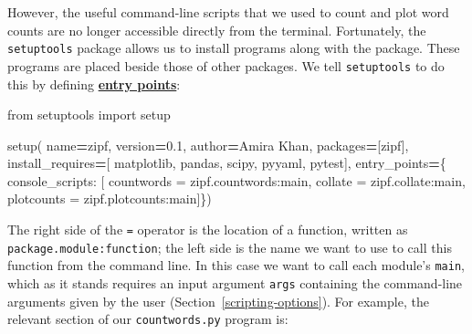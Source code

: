 \documentclass[
]{krantz}
\makeatletter
\newenvironment{Shaded}{\begin{snugshade}}{\end{snugshade}}
\newcommand{\ImportTok}[1]{#1}
\newcommand{\NormalTok}[1]{#1}
\newcommand{\OperatorTok}[1]{\textcolor[rgb]{0.81,0.36,0.00}{\textbf{#1}}}
\newcommand{\StringTok}[1]{\textcolor[rgb]{0.31,0.60,0.02}{#1}}
\newenvironment{kframe}{%
\medskip{}
\setlength{\fboxsep}{.8em}
 \def\at@end@of@kframe{}%
 \ifinner\ifhmode%
  \def\at@end@of@kframe{\end{minipage}}%
  \begin{minipage}{\columnwidth}%
 \fi\fi%
 \def\FrameCommand##1{\hskip\@totalleftmargin \hskip-\fboxsep
 \colorbox{shadecolor}{##1}\hskip-\fboxsep
     \hskip-\linewidth \hskip-\@totalleftmargin \hskip\columnwidth}%
 \MakeFramed {\advance\hsize-\width
   \@totalleftmargin\z@ \linewidth\hsize
   \@setminipage}}%
 {\par\unskip\endMakeFramed%
 \at@end@of@kframe}
\renewenvironment{Shaded}{\begin{kframe}}{\end{kframe}}
\newcommand{\gref}[2]{\hyperlink{#2}{\textbf{#1}}}
\makeatother
\begin{document}
However,
the useful command-line scripts that we used to count and plot word counts
are no longer accessible directly from the terminal.
Fortunately,
the \texttt{setuptools} package allows us to install programs along with the package.
These programs are placed beside those of other packages.
We tell \texttt{setuptools} to do this by defining
\gref{entry points}{entry\_point}:

\begin{Shaded}
\begin{Highlighting}[]
\ImportTok{from}\NormalTok{ setuptools }\ImportTok{import}\NormalTok{ setup}


\NormalTok{setup(}
\NormalTok{    name}\OperatorTok{=}\StringTok{\textquotesingle{}zipf\textquotesingle{}}\NormalTok{,}
\NormalTok{    version}\OperatorTok{=}\StringTok{\textquotesingle{}0.1\textquotesingle{}}\NormalTok{,}
\NormalTok{    author}\OperatorTok{=}\StringTok{\textquotesingle{}Amira Khan\textquotesingle{}}\NormalTok{,}
\NormalTok{    packages}\OperatorTok{=}\NormalTok{[}\StringTok{\textquotesingle{}zipf\textquotesingle{}}\NormalTok{],}
\NormalTok{    install\_requires}\OperatorTok{=}\NormalTok{[}
        \StringTok{\textquotesingle{}matplotlib\textquotesingle{}}\NormalTok{,}
        \StringTok{\textquotesingle{}pandas\textquotesingle{}}\NormalTok{,}
        \StringTok{\textquotesingle{}scipy\textquotesingle{}}\NormalTok{,}
        \StringTok{\textquotesingle{}pyyaml\textquotesingle{}}\NormalTok{,}
        \StringTok{\textquotesingle{}pytest\textquotesingle{}}\NormalTok{],}
\NormalTok{    entry\_points}\OperatorTok{=}\NormalTok{\{}
        \StringTok{\textquotesingle{}console\_scripts\textquotesingle{}}\NormalTok{: [}
            \StringTok{\textquotesingle{}countwords = zipf.countwords:main\textquotesingle{}}\NormalTok{,}
            \StringTok{\textquotesingle{}collate = zipf.collate:main\textquotesingle{}}\NormalTok{,}
            \StringTok{\textquotesingle{}plotcounts = zipf.plotcounts:main\textquotesingle{}}\NormalTok{]\})}
\end{Highlighting}
\end{Shaded}

The right side of the \texttt{=} operator is the location of a function,
written as \texttt{package.module:function};
the left side is the name we want to use to call this function from the command line.
In this case we want to call each module's \texttt{main},
which as it stands requires an input argument \texttt{args}
containing the command-line arguments given by the user (Section~\ref{scripting-options}).
For example,
the relevant section of our \texttt{countwords.py} program is:
\end{document}

